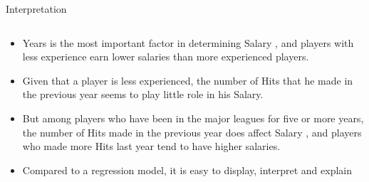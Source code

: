 \documentclass[10pt,ignorenonframetext,]{beamer}
\providecommand{\tightlist}{%
  \setlength{\itemsep}{0pt}\setlength{\parskip}{0pt}}
\begin{document}
\begin{frame}

\begin{block}{Interpretation}

\(~\)

\begin{itemize}
\tightlist
\item
  Years is the most important factor in determining Salary , and players
  with less experience earn lower salaries than more experienced
  players.
\end{itemize}

\vspace{2mm}

\begin{itemize}
\tightlist
\item
  Given that a player is less experienced, the number of Hits that he
  made in the previous year seems to play little role in his Salary.
\end{itemize}

\vspace{2mm}

\begin{itemize}
\tightlist
\item
  But among players who have been in the major leagues for five or more
  years, the number of Hits made in the previous year does affect Salary
  , and players who made more Hits last year tend to have higher
  salaries.
\end{itemize}

\vspace{2mm}

\begin{itemize}
\tightlist
\item
  Compared to a regression model, it is easy to display, interpret and
  explain
\end{itemize}

\end{block}

\end{frame}
\end{document}
